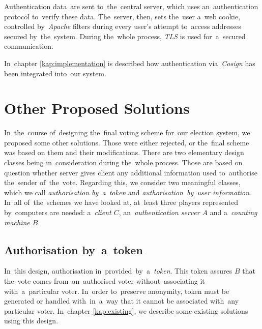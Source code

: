 Authentication data~are sent to~the~central server, which uses an~authentication protocol to~verify these data. The~server, then, sets the~user a~web cookie, controlled by~\emph{Apache} filters during every user's attempt to~access addresses secured by~the~system. During the~whole process, \emph{TLS} is used for~a~secured communication.

In~chapter \ref{kap:implementation} is described how authentication via~\emph{Cosign} has been integrated into~our system.

\section{Other Proposed Solutions}
In~the~course of~designing the~final voting scheme for~our election system, we proposed some other solutions. Those were either rejected, or the~final scheme was based on them and their modifications.
There are two elementary design classes being in~consideration during the~whole process. Those are based on question whether server gives client any additional information used to~authorise the~sender of~the~vote. Regarding this, we consider two meaningful classes, which we call \emph{authorisation by~a~token} and \emph{authorisation~by~user information}. In~all of~the~schemes we have looked at, at~least three players represented by~computers are needed: a~\emph{client $C$}, an~\emph{authentication server $A$} and a~\emph{counting machine $B$}.

\subsection{Authorisation by~a~token}
In~this design, authorisation in~provided~by~a~\emph{token}. This token assures $B$ that the~vote comes from~an~authorised voter without~associating it with~a~particular voter. In~order to~preserve anonymity, token must be generated or handled with~in~a~way that it cannot be associated with~any particular voter. In~chapter \ref{kap:existing}, we describe some existing solutions using this design. 

